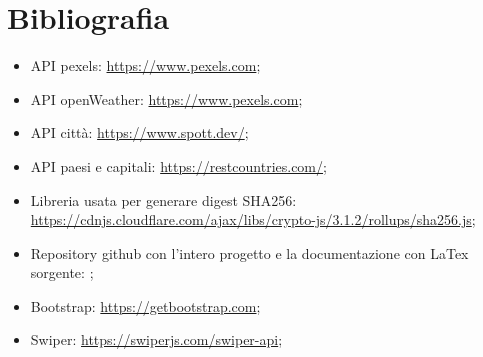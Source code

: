 \chapter{Bibliografia}

\begin{itemize}
    \item API pexels: \url{https://www.pexels.com};
    \item API openWeather: \url{https://www.pexels.com};
    \item API città: \url{https://www.spott.dev/};
    \item API paesi e capitali: \url{https://restcountries.com/};
    \item Libreria usata per generare digest SHA256: \url{https://cdnjs.cloudflare.com/ajax/libs/crypto-js/3.1.2/rollups/sha256.js};
    \item Repository github con l'intero progetto e la documentazione con LaTex sorgente: \url{};
    \item Bootstrap: \url{https://getbootstrap.com};
    \item Swiper: \url{https://swiperjs.com/swiper-api};
\end{itemize}